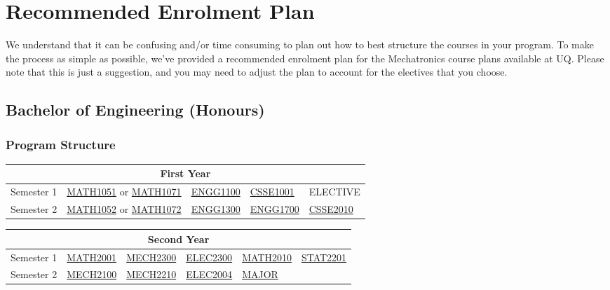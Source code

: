 \chapter{Recommended Enrolment Plan}
We understand that it can be confusing and/or time consuming to plan out how to best structure the courses in your program. To make the process as simple as possible, we've provided a recommended enrolment plan for the Mechatronics course plans available at UQ. Please note that this is just a suggestion, and you may need to adjust the plan to account for the electives that you choose.
\section{Bachelor of Engineering (Honours)}
\subsection{Program Structure}
\renewcommand{\arraystretch}{1.5}
\begin{table}[H]
    \centering
    \begin{tabular}{| m{6em} | m{5em} m{5em} m{5em} m{5em} m{5em} |}
        \hline
        \multicolumn{6}{|c|}{\bfseries First Year} \\
        \hline
        Semester 1 & \multicolumn{2}{c}{\hyperlink{MATH1051}{MATH1051} or \hyperlink{MATH1071}{MATH1071}} & \hyperlink{ENGG1100}{ENGG1100} & \hyperlink{CSSE1001}{CSSE1001} & ELECTIVE \\
        Semester 2 & \multicolumn{2}{c}{\hyperlink{MATH1052}{MATH1052} or \hyperlink{MATH1072}{MATH1072}} & \hyperlink{ENGG1300}{ENGG1300} & \hyperlink{ENGG1700}{ENGG1700} & \hyperlink{CSSE2010}{CSSE2010} \\
        \hline
    \end{tabular}
\end{table}
\begin{table}[H]
    \centering
    \begin{tabular}{| m{6em} | m{5em} m{5em} m{5em} m{5em} m{5em} |}
        \hline
        \multicolumn{6}{|c|}{\bfseries Second Year} \\
        \hline
        Semester 1 & \hyperlink{MATH2001}{MATH2001} & \hyperlink{MECH2300}{MECH2300} & \hyperlink{ELEC2300}{ELEC2300} & \hyperlink{MATH2010}{MATH2010} & \hyperlink{STAT2201}{STAT2201} \\
        Semester 2 & \hyperlink{MECH2100}{MECH2100} & \hyperlink{MECH2210}{MECH2210} & \hyperlink{ELEC2004}{ELEC2004} & \hyperlink{MAJOR}{MAJOR} & \\
        \hline
    \end{tabular}
\end{table}
